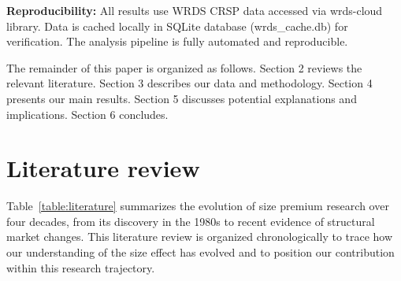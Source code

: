 \documentclass[10pt,letterpaper]{article}
\begin{document}
\textbf{Reproducibility:} All results use WRDS CRSP data accessed via wrds-cloud library. Data is cached locally in SQLite database (wrds\_cache.db) for verification. The analysis pipeline is fully automated and reproducible.

The remainder of this paper is organized as follows. Section 2 reviews the relevant literature. Section 3 describes our data and methodology. Section 4 presents our main results. Section 5 discusses potential explanations and implications. Section 6 concludes.

\section*{Literature review}

Table~\ref{table:literature} summarizes the evolution of size premium research over four decades, from its discovery in the 1980s to recent evidence of structural market changes. This literature review is organized chronologically to trace how our understanding of the size effect has evolved and to position our contribution within this research trajectory.
\end{document}
